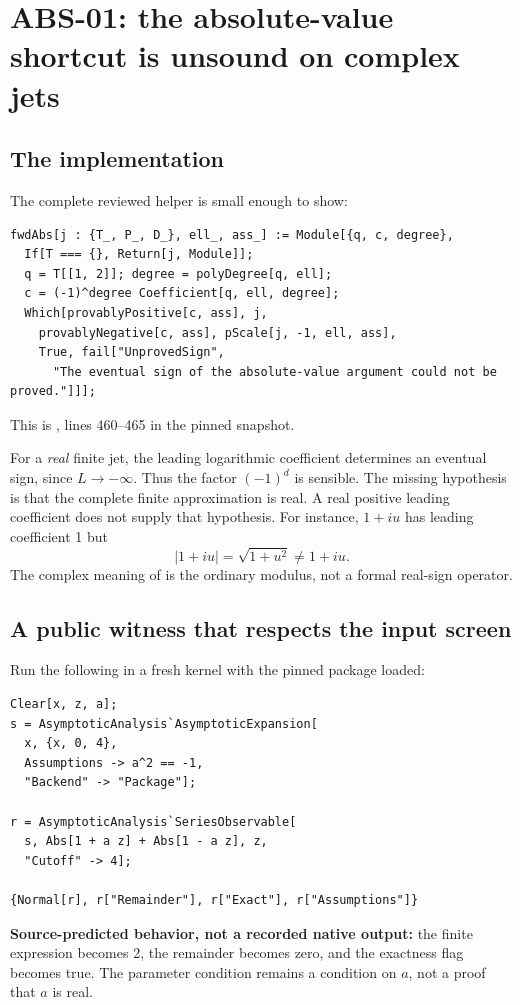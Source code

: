 \documentclass[11pt]{article}
\newcommand{\code}[1]{\texttt{\detokenize{#1}}}
\theoremstyle{remark}\newtheorem{remark}[theorem]{Remark}
\begin{document}
\section{ABS-01: the absolute-value shortcut is unsound on complex jets}
\subsection{The implementation}
The complete reviewed helper is small enough to show:
\begin{lstlisting}
fwdAbs[j : {T_, P_, D_}, ell_, ass_] := Module[{q, c, degree},
  If[T === {}, Return[j, Module]];
  q = T[[1, 2]]; degree = polyDegree[q, ell];
  c = (-1)^degree Coefficient[q, ell, degree];
  Which[provablyPositive[c, ass], j,
    provablyNegative[c, ass], pScale[j, -1, ell, ass],
    True, fail["UnprovedSign",
      "The eventual sign of the absolute-value argument could not be proved."]]];
\end{lstlisting}
This is \code{src/Kernel/AsymptoticAnalysis.wl}, lines 460--465 in the pinned
snapshot.\cite{core}

For a \emph{real} finite jet, the leading logarithmic coefficient determines
an eventual sign, since \(L\to-\infty\). Thus the factor \((-1)^d\) is sensible.
The missing hypothesis is that the complete finite approximation is real.
A real positive leading coefficient does not supply that hypothesis.
For instance, \(1+iu\) has leading coefficient 1 but
\[
 |1+iu|=\sqrt{1+u^2}\ne1+iu.
\]
The complex meaning of \code{Abs} is the ordinary modulus, not a formal
real-sign operator.\cite{absdoc}

\subsection{A public witness that respects the input screen}
Run the following in a fresh kernel with the pinned package loaded:
\begin{lstlisting}
Clear[x, z, a];
s = AsymptoticAnalysis`AsymptoticExpansion[
  x, {x, 0, 4},
  Assumptions -> a^2 == -1,
  "Backend" -> "Package"];

r = AsymptoticAnalysis`SeriesObservable[
  s, Abs[1 + a z] + Abs[1 - a z], z,
  "Cutoff" -> 4];

{Normal[r], r["Remainder"], r["Exact"], r["Assumptions"]}
\end{lstlisting}
\textbf{Source-predicted behavior, not a recorded native output:}
the finite expression becomes 2, the remainder becomes zero, and the exactness
flag becomes true. The parameter condition remains a condition on \(a\), not
a proof that \(a\) is real.
\end{document}
